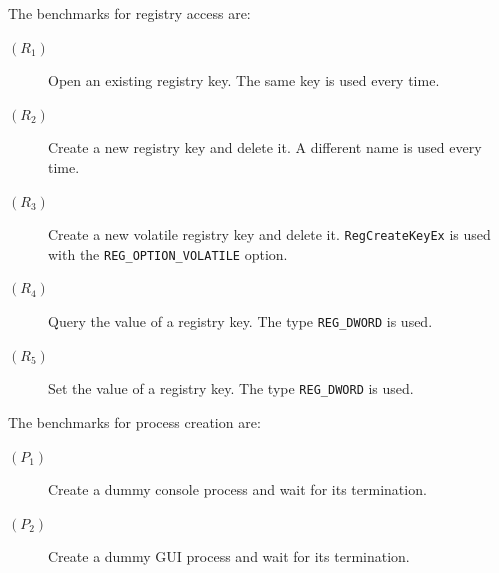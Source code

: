 The benchmarks for registry access are:

\begin{description}
\item[$(R_1)$] Open an existing registry key.  The same key is used every time.
\item[$(R_2)$] Create a new registry key and delete it.  A different name is
used every time. 
\item[$(R_3)$] Create a new volatile registry key and delete it.
{\small\tt RegCreateKeyEx} is used with the {\small\tt REG\_OPTION\_VOLATILE} option.
\item[$(R_4)$] Query the value of a registry key.  The type {\small\tt REG\_DWORD}
is used. 
\item[$(R_5)$] Set the value of a registry key.  The type {\small\tt REG\_DWORD} is
used. 
\end{description}

The benchmarks for process creation are:

\begin{description}
\item[$(P_1)$] Create a dummy console process and wait for its termination.
\item[$(P_2)$] Create a dummy GUI process and wait for its termination.
\end{description}

